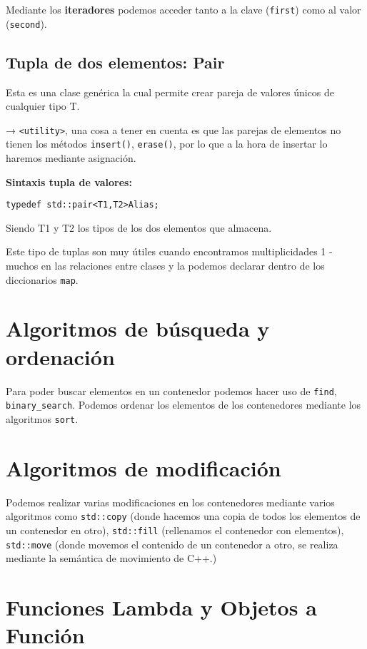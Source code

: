 Mediante los \textbf{iteradores} podemos acceder tanto a la clave (\texttt{first}) como al valor (\texttt{second}).

\subsection{Tupla de dos elementos: Pair}
Esta es una clase genérica la cual permite crear pareja de valores únicos de cualquier tipo T.

 →  \texttt{<utility>}, una cosa a tener en cuenta es que las parejas de elementos
no tienen los métodos \texttt{insert()}, \texttt{erase()}, por lo que a la hora de insertar lo haremos mediante asignación.

\textbf{\large{Sintaxis tupla de valores:}}
\begin{center}
  \begin{lstlisting}[frame=single]
                typedef std::pair<T1,T2>Alias;
  \end{lstlisting}
  \end{center}
Siendo T1 y T2 los tipos de los dos elementos que almacena.

Este tipo de tuplas son muy útiles cuando encontramos multiplicidades 1 - muchos en las relaciones entre clases y la
podemos declarar dentro de los diccionarios \texttt{map}.

\section{Algoritmos de búsqueda y ordenación}
Para poder buscar elementos en un contenedor podemos hacer uso de \texttt{find}, \texttt{binary\_search}.
Podemos ordenar los elementos de los contenedores mediante los algoritmos \texttt{sort}.
\section{Algoritmos de modificación}
Podemos realizar varias modificaciones en los contenedores mediante varios algoritmos como \texttt{std::copy} (donde hacemos una copia de todos los elementos de un contenedor en otro),
\texttt{std::fill} (rellenamos el contenedor con elementos), \texttt{std::move} (donde movemos el contenido de un contenedor a otro, se realiza mediante la semántica de movimiento de C++.)

\section{Funciones Lambda y Objetos a Función}

